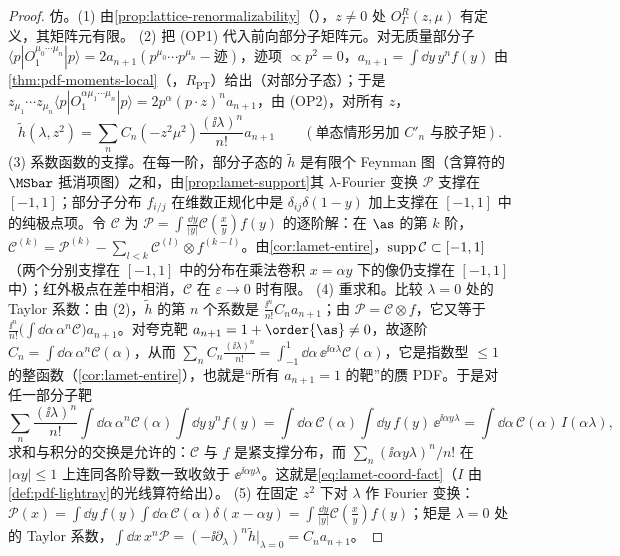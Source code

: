 \begin{proof}
仿\cite[第~II--III~节]{IzubuchiEtAl2018}。(1) 由\cref{prop:lattice-renormalizability}（\tagA），$z\neq0$ 处 $O^R_\Gamma(z,\mu)$ 有定义，其矩阵元有限。
(2) 把 (OP1) 代入前向部分子矩阵元。对无质量部分子 $\langle p|O_1^{\mu_0\cdots\mu_n}|p\rangle=2a_{n+1}(p^{\mu_0}\cdots p^{\mu_n}-\text{迹})$，迹项 $\propto p^2=0$，$a_{n+1}=\int\dd y\,y^nf(y)$ 由\cref{thm:pdf-moments-local}（\tagR，$R_{\mathrm{PT}}$）给出（对部分子态）；于是 $z_{\mu_1}\cdots z_{\mu_n}\langle p|O_1^{\alpha\mu_1\cdots\mu_n}|p\rangle=2p^\alpha(p\cdot z)^na_{n+1}$，由 (OP2)，对所有 $z$，
\[
\tilde h(\lambda,z^2)=\sum_nC_n(-z^2\mu^2)\frac{(\ii\lambda)^n}{n!}a_{n+1}\qquad(\text{单态情形另加 }C'_n\text{ 与胶子矩}).
\]
(3) 系数函数的支撑。在每一阶，部分子态的 $\tilde h$ 是有限个 Feynman 图（含算符的 $\MSbar$ 抵消项图）之和，由\cref{prop:lamet-support}其 $\lambda$-Fourier 变换 $\mathcal P$ 支撑在 $[-1,1]$；部分子分布 $f_{i/j}$ 在维数正规化中是 $\delta_{ij}\delta(1-y)$ 加上支撑在 $[-1,1]$ 中的纯极点项。令 $\mathcal C$ 为 $\mathcal P=\int\frac{\dd y}{|y|}\mathcal C(\frac xy)f(y)$ 的逐阶解：在 $\as$ 的第 $k$ 阶，$\mathcal C^{(k)}=\mathcal P^{(k)}-\sum_{l<k}\mathcal C^{(l)}\otimes f^{(k-l)}$。由\cref{cor:lamet-entire}，${\rm supp}\,\mathcal C\subset[-1,1]$（两个分别支撑在 $[-1,1]$ 中的分布在乘法卷积 $x=\alpha y$ 下的像仍支撑在 $[-1,1]$ 中）；红外极点在差中相消，$\mathcal C$ 在 $\varepsilon\to0$ 时有限。
(4) 重求和。比较 $\lambda=0$ 处的 Taylor 系数：由 (2)，$\tilde h$ 的第 $n$ 个系数是 $\frac{\ii^n}{n!}C_na_{n+1}$；由 $\mathcal P=\mathcal C\otimes f$，它又等于 $\frac{\ii^n}{n!}\big(\int\dd\alpha\,\alpha^n\mathcal C\big)a_{n+1}$。对夸克靶 $a_{n+1}=1+\order{\as}\neq0$，故逐阶 $C_n=\int\dd\alpha\,\alpha^n\mathcal C(\alpha)$，从而 $\sum_nC_n\frac{(\ii\lambda)^n}{n!}=\int_{-1}^1\dd\alpha\,\ee^{\ii\alpha\lambda}\mathcal C(\alpha)$，它是指数型 $\le1$ 的整函数（\cref{cor:lamet-entire}），也就是“所有 $a_{n+1}=1$ 的靶”的赝 PDF。于是对任一部分子靶
\[
\sum_n\frac{(\ii\lambda)^n}{n!}\int\dd\alpha\,\alpha^n\mathcal C(\alpha)\int\dd y\,y^nf(y)=\int\dd\alpha\,\mathcal C(\alpha)\int\dd y\,f(y)\,\ee^{\ii\alpha y\lambda}=\int\dd\alpha\,\mathcal C(\alpha)\,I(\alpha\lambda),
\]
求和与积分的交换是允许的：$\mathcal C$ 与 $f$ 是紧支撑分布，而 $\sum_n(\ii\alpha y\lambda)^n/n!$ 在 $|\alpha y|\le1$ 上连同各阶导数一致收敛于 $\ee^{\ii\alpha y\lambda}$。这就是\cref{eq:lamet-coord-fact}（$I$ 由\cref{def:pdf-lightray}的光线算符给出）。
(5) 在固定 $z^2$ 下对 $\lambda$ 作 Fourier 变换：$\mathcal P(x)=\int\dd y\,f(y)\int\dd\alpha\,\mathcal C(\alpha)\delta(x-\alpha y)=\int\frac{\dd y}{|y|}\mathcal C(\frac xy)f(y)$；矩是 $\lambda=0$ 处的 Taylor 系数，$\int\dd x\,x^n\mathcal P=(-\ii\partial_\lambda)^n\tilde h|_{\lambda=0}=C_na_{n+1}$。
\end{proof}

